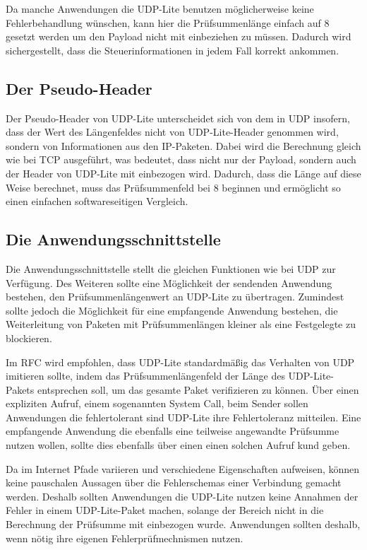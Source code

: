 \documentclass{template}
\begin{document}
Da manche Anwendungen die UDP-Lite benutzen möglicherweise keine
Fehlerbehandlung wünschen, kann hier die Prüfsummenlänge einfach
auf 8 gesetzt werden um den Payload nicht mit einbeziehen zu müssen.
Dadurch wird sichergestellt, dass die Steuerinformationen in jedem
Fall korrekt ankommen.


\subsection{Der Pseudo-Header}

Der Pseudo-Header von UDP-Lite unterscheidet sich von dem in UDP
insofern, dass der Wert des Längenfeldes nicht von UDP-Lite-Header genommen wird,
sondern von Informationen aus den IP-Paketen. Dabei wird die
Berechnung gleich wie bei TCP ausgeführt, was bedeutet, dass
nicht nur der Payload, sondern auch der Header von UDP-Lite mit
einbezogen wird. Dadurch, dass die Länge auf diese Weise berechnet,
muss das Prüfsummenfeld bei 8 beginnen und ermöglicht so einen
einfachen softwareseitigen Vergleich.


\subsection{Die Anwendungsschnittstelle}

Die Anwendungsschnittstelle stellt die gleichen Funktionen wie
bei UDP zur Verfügung. Des Weiteren sollte eine Möglichkeit der
sendenden Anwendung bestehen, den Prüfsummenlängenwert an UDP-Lite
zu übertragen. Zumindest sollte jedoch die Möglichkeit für eine
empfangende Anwendung bestehen, die Weiterleitung von Paketen mit
Prüfsummenlängen kleiner als eine Festgelegte zu blockieren.

Im RFC wird empfohlen, dass UDP-Lite standardmäßig das Verhalten
von UDP imitieren sollte, indem das Prüfsummenlängenfeld der
Länge des UDP-Lite-Pakets entsprechen soll, um das gesamte Paket
verifizieren zu können. Über einen expliziten Aufruf, einem
sogenannten System Call, beim Sender sollen Anwendungen die 
fehlertolerant sind UDP-Lite ihre Fehlertoleranz
mitteilen. Eine empfangende Anwendung die ebenfalls eine teilweise
angewandte Prüfsumme nutzen wollen, sollte dies ebenfalls über
einen einen solchen Aufruf kund geben.

Da im Internet Pfade variieren und verschiedene Eigenschaften aufweisen,
können keine pauschalen Aussagen über die Fehlerschemas einer
Verbindung gemacht werden. Deshalb sollten Anwendungen die UDP-Lite
nutzen keine Annahmen der Fehler in einem UDP-Lite-Paket machen,
solange der Bereich nicht in die Berechnung der Prüfsumme
mit einbezogen wurde. Anwendungen sollten deshalb, wenn nötig
ihre eigenen Fehlerprüfmechnismen nutzen.
\end{document}
